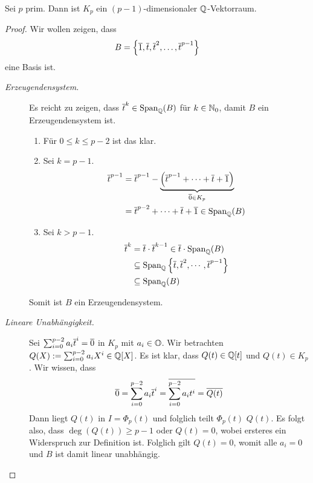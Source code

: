 \documentclass[12pt,a4paper]{scrartcl}
\begin{document}
\begin{lem} \label{lem:kreisteilkoerpervekraum}
	Sei $p$ prim. Dann ist $K_p$ ein $(p-1)$-dimensionaler $\mathbb Q$-Vektorraum.
\end{lem}

\begin{proof}
	Wir wollen zeigen, dass
	\begin{equation*}
		B = \left\lbrace \overline{1}, \overline{t}, \overline{t}^2, \dots, \overline{t}^{p-1} \right\rbrace 
	\end{equation*}
	eine Basis ist.
	
	\begin{description}
		\item[\emph{Erzeugendensystem.}] Es reicht zu zeigen, dass $\overline{t}^k \in \operatorname{Span}_{\mathbb Q}(B)$ für $k \in \mathbb N_0$, damit $B$ ein Erzeugendensystem ist.
		\begin{enumerate}
			\item Für $0 \leq k \leq p-2$ ist das klar.
			\item Sei $k = p-1$. 
			\begin{align*}
			\overline{t}^{p-1} &= \overline{t}^{p-1}- \underbrace{\left( \overline{t}^{p-1} + \dots + \overline{t} + \overline{1} \right)}_{\overline{0} \in K_p} \\
			&= \overline{t}^{p-2} + \dots + \overline{t} + \overline{1} \in \operatorname{Span}_{\mathbb Q}(B)
			\end{align*}
			\item Sei $k > p-1$.
			\begin{align*}
			\overline{t}^k &= \overline{t} \cdot \overline{t}^{k-1} \in \overline{t} \cdot \operatorname{Span}_{\mathbb Q}(B) \\
			&\subseteq \operatorname{Span}_{\mathbb Q}\left\lbrace \overline{t}, \overline{t}^2, \cdots , \overline{t} ^ {p-1} \right\rbrace \\
			&\subseteq \operatorname{Span}_{\mathbb Q}(B)
			\end{align*}
		\end{enumerate}
		Somit ist $B$ ein Erzeugendensystem.
		\item[\emph{Lineare Unabhängigkeit.}] Sei $\sum_{i=0}^{p-2}a_i\overline{t}^i = \overline{0}$ in $K_p$ mit $a_i \in \mathbb O$. Wir betrachten $Q(X) := \sum_{i=0}^{p-2}a_iX^i \in \mathbb Q[X]$. Es ist klar, dass $Q(t) \in \mathbb Q[t]$ und $Q(t) \in K_p$. Wir wissen, dass
		\[
		\overline{0} = \sum_{i=0}^{p-2}a_i\overline{t}^i = \overline{\sum_{i=0}^{p-2}a_it^i} = \overline{Q(t)}
		\]
		Dann liegt $Q(t)$ in $I = \Phi_p(t)$ und folglich teilt $\Phi_p(t)$ $Q(t)$. Es folgt also, dass $\deg(Q(t)) \geq p-1$ oder $Q(t) = 0$, wobei ersteres ein Widerspruch zur Definition ist. Folglich gilt $Q(t) = 0$, womit alle $a_i = 0$ und $B$ ist damit linear unabhängig.
	\end{description}
\end{proof}
\end{document}
